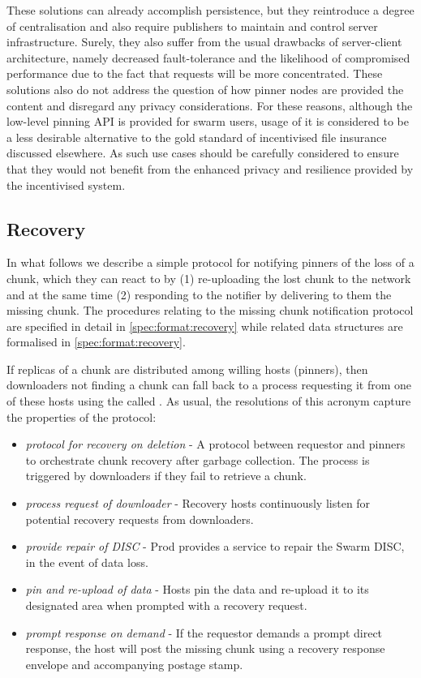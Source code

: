 These solutions can already accomplish persistence, but they reintroduce a degree of centralisation and also require publishers to maintain and control server infrastructure. Surely, they also suffer from the usual drawbacks of server-client architecture, namely decreased fault-tolerance and the likelihood of compromised performance due to the fact that requests will be more concentrated. These solutions also do not address the question of how pinner nodes are provided the content and disregard any privacy considerations. For these reasons, although the low-level pinning API is provided for swarm users, usage of it is considered to be a less desirable alternative to the gold standard of incentivised file insurance discussed elsewhere. As such use cases should be carefully considered to ensure that they would not benefit from the enhanced privacy and resilience provided by the incentivised system.



\subsection{Recovery \statusyellow}\label{sec:recovery-chunks}


In what follows we describe a simple protocol for notifying pinners of the loss of a chunk, which they can react to by (1) re-uploading the lost chunk to the network and at the same time (2) responding to the notifier by delivering to them the missing chunk. The procedures relating to the missing chunk notification protocol are specified in detail in  \ref{spec:format:recovery} while related data structures are formalised in \ref{spec:format:recovery}.

If replicas of a chunk are distributed among willing hosts (pinners), then downloaders not finding a chunk can fall back to a  process requesting it from one of these hosts using the  called .
As usual, the resolutions of this acronym capture the properties of the protocol:

\begin{itemize}
\item \emph{protocol for recovery on deletion} - A protocol between requestor and pinners to orchestrate chunk recovery after garbage collection. The process is triggered by downloaders if they fail to retrieve a chunk.
\item \emph{process request of downloader} - Recovery hosts continuously listen for potential recovery requests from downloaders.
\item \emph{provide repair of DISC} - 
Prod provides a service to repair the Swarm DISC, in the event of data loss.
\item \emph{pin and re-upload of data} -     
Hosts pin the data and re-upload it to its designated area when prompted with a recovery request. 
\item \emph{prompt response on demand}  - If the requestor demands a prompt direct response, the host will post the missing chunk using a recovery response envelope and accompanying postage stamp.
\end{itemize}

